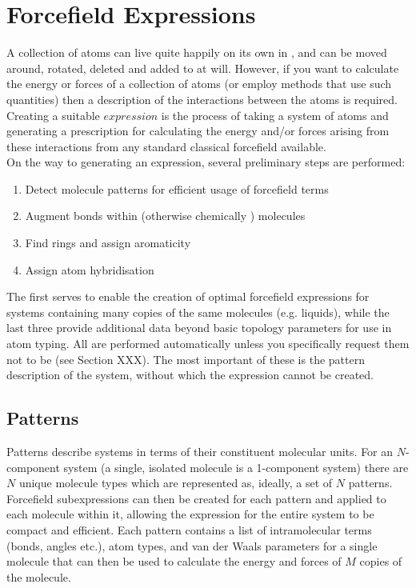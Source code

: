\chapter{Forcefield Expressions}

A collection of atoms can live quite happily on its own in \progname{}, and can be moved around, rotated, deleted and added to at will. However, if you want to calculate the energy or forces of a collection of atoms (or employ methods that use such quantities) then a description of the interactions between the atoms is required. Creating a suitable $expression$ is the process of taking a system of atoms and generating a prescription for calculating the energy and/or forces arising from these interactions from any standard classical forcefield available.\\

On the way to generating an expression, several preliminary steps are performed:

\begin{enumerate}
	\item Detect molecule patterns for efficient usage of forcefield terms
	\item Augment bonds within (otherwise chemically ) molecules
	\item Find rings and assign aromaticity
	\item Assign atom hybridisation
\end{enumerate}

The first serves to enable the creation of optimal forcefield expressions for systems containing many copies of the same molecules (e.g. liquids), while the last three provide additional data beyond basic topology parameters for use in atom typing. All are performed automatically unless you specifically request them not to be (see Section XXX). The most important of these is the pattern description of the system, without which the expression cannot be created.

\section{Patterns}

Patterns describe systems in terms of their constituent molecular units. For an $N$-component system (a single, isolated molecule is a 1-component system) there are $N$ unique molecule types which are represented as, ideally, a set of $N$ patterns. Forcefield subexpressions can then be created for each pattern and applied to each molecule within it, allowing the expression for the entire system to be compact and efficient. Each pattern contains a list of intramolecular terms (bonds, angles etc.), atom types, and van der Waals parameters for a single molecule that can then be used to calculate the energy and forces of $M$ copies of the molecule.


